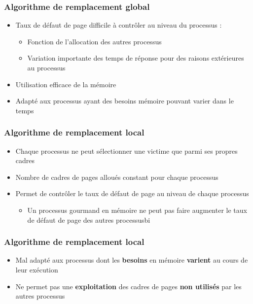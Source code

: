 \begin{frame}
\frametitle{Algorithme de remplacement global}
\begin{itemize}
\item Taux de défaut de page difficile à contrôler au niveau du processus :
\begin{itemize}
\item Fonction de l'allocation des autres processus
\item Variation importante des temps de réponse pour des raisons extérieures au processus
\end{itemize}
\item Utilisation efficace de la mémoire 
\item Adapté aux processus ayant des besoins mémoire pouvant varier dans le temps
\end{itemize}
\end{frame}


\begin{frame}
\frametitle{Algorithme de remplacement local}
\begin{itemize}
\item Chaque processus ne peut sélectionner une victime que parmi ses propres cadres
\item Nombre de cadres de pages alloués constant pour chaque processus
\item Permet de contrôler le taux de défaut de page au niveau de chaque processus
\begin{itemize}
\item Un processus gourmand en mémoire ne peut pas faire augmenter le taux de défaut de page des autres processusbi
\end{itemize}
\end{itemize}
\end{frame}


\begin{frame}
\frametitle{Algorithme de remplacement local}
\begin{itemize}
\item Mal adapté aux processus dont les \textbf{besoins} en mémoire \textbf{varient} au cours de leur exécution
\item Ne permet pas une \textbf{exploitation} des cadres de pages \textbf{non utilisés} par les autres processus
\end{itemize}
\end{frame}


